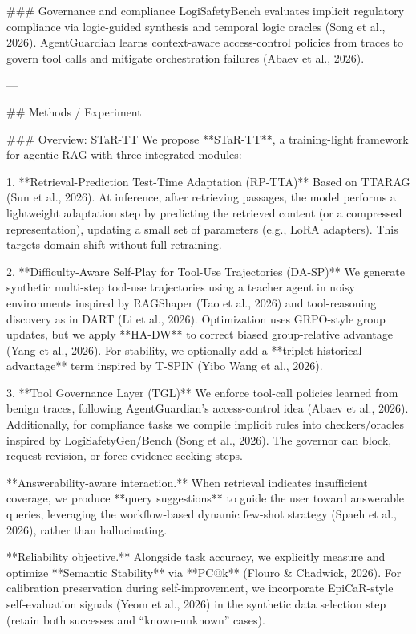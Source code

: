 ### Governance and compliance  
LogiSafetyBench evaluates implicit regulatory compliance via logic-guided synthesis and temporal logic oracles (Song et al., 2026). AgentGuardian learns context-aware access-control policies from traces to govern tool calls and mitigate orchestration failures (Abaev et al., 2026).

---

## Methods / Experiment  

### Overview: STaR-TT  
We propose **STaR-TT**, a training-light framework for agentic RAG with three integrated modules:

1. **Retrieval-Prediction Test-Time Adaptation (RP-TTA)**  
   Based on TTARAG (Sun et al., 2026). At inference, after retrieving passages, the model performs a lightweight adaptation step by predicting the retrieved content (or a compressed representation), updating a small set of parameters (e.g., LoRA adapters). This targets domain shift without full retraining.

2. **Difficulty-Aware Self-Play for Tool-Use Trajectories (DA-SP)**  
   We generate synthetic multi-step tool-use trajectories using a teacher agent in noisy environments inspired by RAGShaper (Tao et al., 2026) and tool-reasoning discovery as in DART (Li et al., 2026). Optimization uses GRPO-style group updates, but we apply **HA-DW** to correct biased group-relative advantage (Yang et al., 2026). For stability, we optionally add a **triplet historical advantage** term inspired by T-SPIN (Yibo Wang et al., 2026).

3. **Tool Governance Layer (TGL)**  
   We enforce tool-call policies learned from benign traces, following AgentGuardian’s access-control idea (Abaev et al., 2026). Additionally, for compliance tasks we compile implicit rules into checkers/oracles inspired by LogiSafetyGen/Bench (Song et al., 2026). The governor can block, request revision, or force evidence-seeking steps.

**Answerability-aware interaction.** When retrieval indicates insufficient coverage, we produce **query suggestions** to guide the user toward answerable queries, leveraging the workflow-based dynamic few-shot strategy (Spaeh et al., 2026), rather than hallucinating.

**Reliability objective.** Alongside task accuracy, we explicitly measure and optimize **Semantic Stability** via **PC@k** (Flouro & Chadwick, 2026). For calibration preservation during self-improvement, we incorporate EpiCaR-style self-evaluation signals (Yeom et al., 2026) in the synthetic data selection step (retain both successes and “known-unknown” cases).

